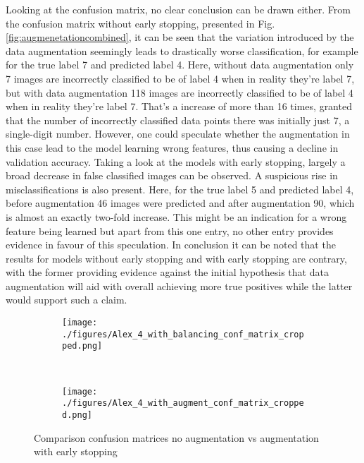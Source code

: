 Looking at the confusion matrix, no clear conclusion can be drawn either. From the confusion matrix without early stopping, presented in Fig. \ref{fig:augmenetationcombined}, it can be seen that the variation introduced by the data augmentation seemingly leads to drastically worse classification, for example for the true label 7 and predicted label 4. Here, without data augmentation only 7 images are incorrectly classified to be of label 4 when in reality they're label 7, but with data augmentation 118 images are incorrectly classified to be of label 4 when in reality they're label 7. That's a increase of more than 16 times, granted that the number of incorrectly classified data points there was initially just 7, a single-digit number. However, one could speculate whether the augmentation in this case lead to the model learning wrong features, thus causing a decline in validation accuracy.\newline
Taking a look at the models with early stopping, largely a broad decrease in false classified images can be observed. A suspicious rise in misclassifications is also present. Here, for the true label 5 and  predicted label 4, before augmentation 46 images were predicted and after augmentation 90, which is almost an exactly two-fold increase. This might be an indication for a wrong feature being learned but apart from this one entry, no other entry provides evidence in favour of this speculation. In conclusion it can be noted that the results for models without early stopping and with early stopping are contrary, with the former providing evidence against the initial hypothesis that data augmentation will aid with overall achieving more true positives while the latter would support such a claim.
\begin{figure}[h]
	\centering
	\begin{subfigure}{0.49\columnwidth}
		\texttt{[image: ./figures/Alex\_4\_with\_balancing\_conf\_matrix\_cropped.png]}
		\label{fig:noaugmentationearly}
	\end{subfigure} 
	~
	\begin{subfigure}{0.49\columnwidth}
		\texttt{[image: ./figures/Alex\_4\_with\_augment\_conf\_matrix\_cropped.png]}
		\label{fig:augmentationearly}
	\end{subfigure}
	\caption{Comparison confusion matrices no augmentation vs augmentation with early stopping}
	\label{fig:augearlycombined}
\end{figure}



